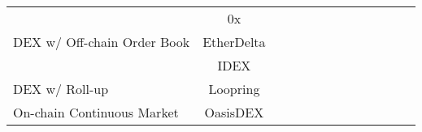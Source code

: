 \begin{table*}[t]
\begin{tabular}{|l|c|p{0.4cm}|p{0.4cm}|p{0.4cm}|p{0.4cm}|p{0.4cm}|p{0.4cm}|p{0.4cm}|p{0.4cm}|p{0.4cm}|p{0.4cm}|p{0.4cm}|}
\multirow{3}{*}{DEX w/ Off-chain Order Book}	&0x				&\multirow{3}{*}{\full}		&\multirow{3}{*}{\full}		&\multirow{3}{*}{\full}		&\multirow{3}{*}{\empt}		&\multirow{3}{*}{\empt}		&\multirow{3}{*}{\prt} 		&\multirow{3}{*}{\full}		&\multirow{3}{*}{\empt }		&\multirow{3}{*}{\full }		&\multirow{3}{*}{\full}		&\multirow{3}{*}{\full} 		\\ 
							       	&EtherDelta		& 						&						&						&						&						&						&						&						&						& 						&						\\
								&IDEX     			& 						&						&						&						&						&						&						&						&						& 						&						\\ \hline
\multirow{1}{*}{DEX w/ Roll-up}    			&Loopring			&\multirow{1}{*}{\full}		&\multirow{1}{*}{\full}		&\multirow{1}{*}{\empt}		&\multirow{1}{*}{\empt}		&\multirow{1}{*}{\empt}		&\multirow{1}{*}{\prt} 		&\multirow{1}{*}{\prt}		&\multirow{1}{*}{\empt}		&\multirow{1}{*}{\full}		&\multirow{1}{*}{\full }		&\multirow{1}{*}{\full } 		\\ \hline

\multirow{1}{*}{On-chain Continuous Market}	&OasisDEX			&\multirow{1}{*}{\full}		&\multirow{1}{*}{\full}		&\multirow{1}{*}{\full}		&\multirow{1}{*}{\empt}		&\multirow{1}{*}{\full}		&\multirow{1}{*}{\empt} 		&\multirow{1}{*}{\empt}		&\multirow{1}{*}{\empt}		&\multirow{1}{*}{\full}		&\multirow{1}{*}{\full }		&\multirow{1}{*}{\full } 		\\ \hline


\end{tabular}
\end{table*}
